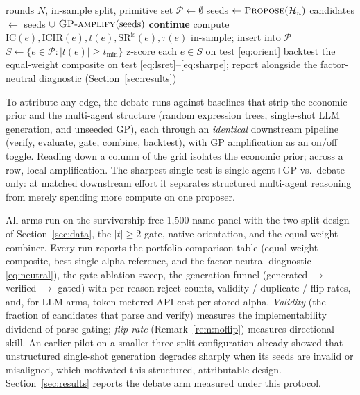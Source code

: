 \documentclass{article}
\theoremstyle{definition}
\theoremstyle{plain}
\theoremstyle{remark}
\newcommand{\Sharpe}{\mathrm{SR}}
\newcommand{\IC}{\mathrm{IC}}
\newcommand{\ICIR}{\mathrm{ICIR}}
\begin{document}
\begin{algorithm}[h]
\caption{Outer search: propose $\to$ amplify $\to$ verify $\to$ evaluate $\to$ store}
\begin{algorithmic}[1]
\Require rounds $N$, in-sample split, primitive set
\State $\mathcal{P}\gets\emptyset$ 
  \State seeds $\gets \textsc{Propose}(\mathcal{H}_n)$ 
  \State candidates $\gets$ seeds $\cup\ \textsc{GP-amplify}(\text{seeds})$
     \textbf{continue}
    \EndIf
    \State compute $\overline{\IC}(e), \ICIR(e), t(e), \Sharpe^{\text{is}}(e), \tau(e)$ in-sample; insert into $\mathcal{P}$
  \EndFor
\EndFor
\State $S \gets \{e\in\mathcal{P} : |t(e)| \ge t_{\min}\}$ 
\State z-score each $e\in S$ on test \eqref{eq:orient} 
\State backtest the equal-weight composite on test \eqref{eq:lsret}--\eqref{eq:sharpe};
       report alongside the factor-neutral diagnostic (Section~\ref{sec:results})
\end{algorithmic}
\end{algorithm}

To attribute any edge, the debate runs against baselines that strip the economic prior
and the multi-agent structure (random expression trees, single-shot LLM generation,
and unseeded GP), each through an \emph{identical} downstream pipeline (verify,
evaluate, gate, combine, backtest), with GP amplification as an on/off toggle. Reading
down a column of the grid isolates the economic prior; across a row, local
amplification. The sharpest single test is single-agent$+$GP vs.\ debate-only: at
matched downstream effort it separates structured multi-agent reasoning from merely
spending more compute on one proposer.

All arms run on the survivorship-free 1{,}500-name panel with the two-split design of
Section~\ref{sec:data}, the $|t|\ge2$ gate, native orientation, and the equal-weight
combiner. Every run reports the portfolio comparison table (equal-weight composite,
best-single-alpha reference, and the factor-neutral diagnostic \eqref{eq:neutral}), the
gate-ablation sweep, the generation funnel (generated $\to$ verified $\to$ gated) with
per-reason reject counts, validity / duplicate / flip rates, and, for LLM arms,
token-metered API cost per stored alpha. \emph{Validity} (the fraction of candidates
that parse and verify) measures the implementability dividend of parse-gating;
\emph{flip rate} (Remark~\ref{rem:noflip}) measures directional skill. An earlier pilot
on a smaller three-split configuration already showed that unstructured single-shot
generation degrades sharply when its seeds are invalid or misaligned, which motivated
this structured, attributable design. Section~\ref{sec:results} reports the debate arm
measured under this protocol.
\end{document}
